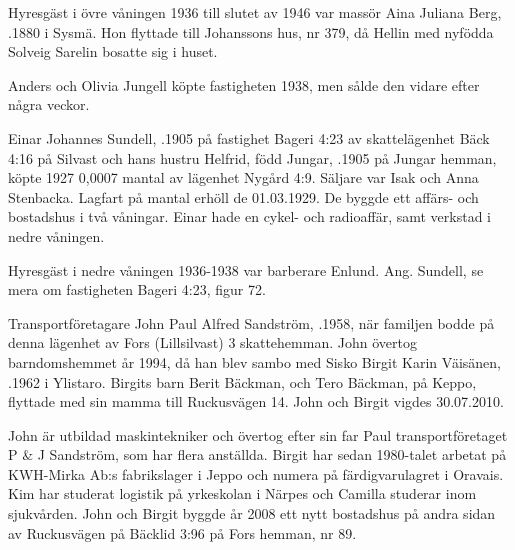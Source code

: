 Hyresgäst i övre våningen 1936 till slutet av 1946 var massör	Aina Juliana Berg, .1880 i Sysmä. Hon flyttade till Johanssons hus, nr 379, då Hellin med nyfödda Solveig Sarelin bosatte sig i huset.


%
Anders och Olivia Jungell köpte fastigheten 1938, men sålde den vidare efter några veckor.\jhvspace{}


%
Einar Johannes Sundell, .1905 på fastighet Bageri 4:23 av 	skattelägenhet Bäck 4:16 på Silvast och hans hustru Helfrid, född Jungar, .1905 på Jungar hemman, köpte 1927 0,0007 mantal av lägenhet Nygård 4:9. Säljare var Isak och Anna Stenbacka. Lagfart på mantal erhöll de 01.03.1929. De byggde ett affärs- och bostadshus i två våningar. Einar hade en cykel- och radioaffär, samt verkstad i nedre våningen.

Hyresgäst i nedre våningen 1936-1938 var barberare Enlund.
Ang. Sundell, se mera om fastigheten Bageri 4:23, figur 72.



%



%
Transportföretagare John Paul Alfred Sandström, .1958, när familjen bodde på denna lägenhet av Fors (Lillsilvast) 3 skattehemman. John övertog barndomshemmet år 1994, då han blev sambo med Sisko Birgit Karin Väisänen, .1962 i Ylistaro. Birgits barn Berit Bäckman,  och Tero Bäckman,  på Keppo, flyttade med sin mamma till Ruckusvägen 14. John och Birgit vigdes 30.07.2010.
\begin{jhchildren}
  \item {}
  \item {}
\end{jhchildren}

John är utbildad maskintekniker och övertog efter sin far Paul transportföretaget P \& J Sandström, som har flera anställda. Birgit har sedan 1980-talet arbetat på KWH-Mirka Ab:s fabrikslager i Jeppo och numera på färdigvarulagret i Oravais. Kim har studerat logistik på yrkeskolan i Närpes och Camilla studerar inom sjukvården. John och Birgit byggde år 2008 ett nytt bostadshus på andra sidan av Ruckusvägen på Bäcklid 3:96 på Fors hemman, nr 89.

